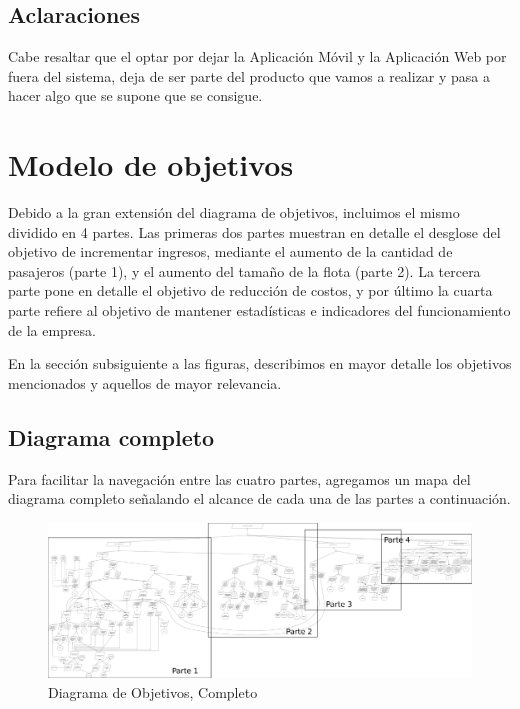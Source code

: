 \documentclass[a4paper, 10pt, twoside]{article}
\begin{document}
 \subsection{Aclaraciones}
 
 Cabe resaltar que el optar por dejar la Aplicación M\'ovil y la Aplicación Web por fuera del sistema, deja de ser parte del producto que vamos a realizar y pasa a hacer algo que se supone que se consigue.
 
\newpage



\section{Modelo de objetivos}

Debido a la gran extensión del diagrama de objetivos, incluimos el mismo dividido en 4 partes. Las primeras dos partes muestran en detalle el desglose del objetivo de incrementar ingresos, mediante el aumento de la cantidad de pasajeros (parte 1), y el aumento del tamaño de la flota (parte 2). La tercera parte pone en detalle el objetivo de reducción de costos, y por último la cuarta parte refiere al objetivo de mantener estadísticas e indicadores del funcionamiento de la empresa.

En la sección subsiguiente a las figuras, describimos en mayor detalle los objetivos mencionados y aquellos de mayor relevancia.

\subsection{Diagrama completo}

Para facilitar la navegación entre las cuatro partes, agregamos un mapa del diagrama completo señalando el alcance de cada una de las partes a continuación.

\begin{figure}[H]
  \includegraphics[width=\textwidth]{diagramas/diagrama-objetivos-4.png}
  \caption{Diagrama de Objetivos, Completo}
  \label{fig:diagrama-objetivos-completo}
\end{figure}
\end{document}
